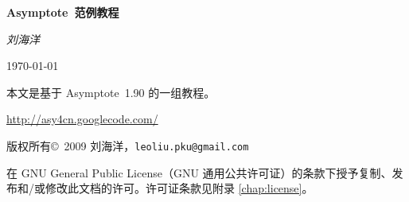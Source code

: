 \documentclass[cs4size,oneside,openany,nofonts,UTF8,CJKnormalspaces]
  {ctexbook}[2009/05/20]
\newcommand*\Asy{\textsf{Asymptote}}
\newcommand*\asyversion{1.90}
\begin{document}
\frontmatter

\begin{titlepage}
\begin{center}
  {\bfseries
  \Asy\ 范例教程}
\bigskip

  {\rmfamily\itshape
  刘海洋}
\bigskip

  {\today}
\end{center}
\end{titlepage}

\begingroup
\setlength{\parindent}{0pt}
本文是基于 \Asy\ \asyversion{} 的一组教程。

\url{http://asy4cn.googlecode.com/}
\medskip

版权所有\copyright\ 2009 刘海洋，\nolinkurl{leoliu.pku@gmail.com}

{\setlength{\leftskip}{2em}
在 GNU General Public License（GNU 通用公共许可证）的条款下授予复制、发布和/或修改此文档的许可。许可证条款见附录 \ref{chap:license}。\par}
\endgroup
\newpage

\tableofcontents

\mainmatter





\appendix


\printindex



\end{document}
